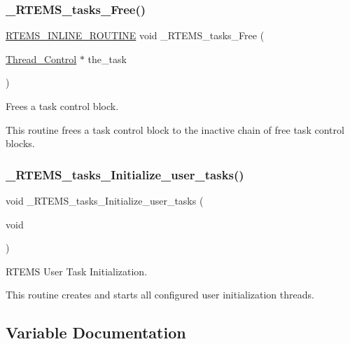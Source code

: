 \subsubsection{\texorpdfstring{\_RTEMS\_tasks\_Free()}{\_RTEMS\_tasks\_Free()}}
{\footnotesize\ttfamily \mbox{\hyperlink{group__RTEMSScoreBaseDefs_gac216239df231d5dbd15e3520b0b9313f}{R\+T\+E\+M\+S\+\_\+\+I\+N\+L\+I\+N\+E\+\_\+\+R\+O\+U\+T\+I\+NE}} void \+\_\+\+R\+T\+E\+M\+S\+\_\+tasks\+\_\+\+Free (\begin{DoxyParamCaption}\item[{\mbox{\hyperlink{struct__Thread__Control}{Thread\+\_\+\+Control}} $\ast$}]{the\+\_\+task }\end{DoxyParamCaption})}



Frees a task control block. 

This routine frees a task control block to the inactive chain of free task control blocks. \mbox{\label{group__ClassicTasksImpl_gaff2d060c5f1c2097e1cb9d844903ea02}} 
\subsubsection{\texorpdfstring{\_RTEMS\_tasks\_Initialize\_user\_tasks()}{\_RTEMS\_tasks\_Initialize\_user\_tasks()}}
{\footnotesize\ttfamily void \+\_\+\+R\+T\+E\+M\+S\+\_\+tasks\+\_\+\+Initialize\+\_\+user\+\_\+tasks (\begin{DoxyParamCaption}\item[{void}]{ }\end{DoxyParamCaption})}



R\+T\+E\+MS User Task Initialization. 

This routine creates and starts all configured user initialization threads. 

\subsection{Variable Documentation}
\mbox{\label{group__ClassicTasksImpl_ga2bbd56e70663be90a170a5fc112f564c}} 
